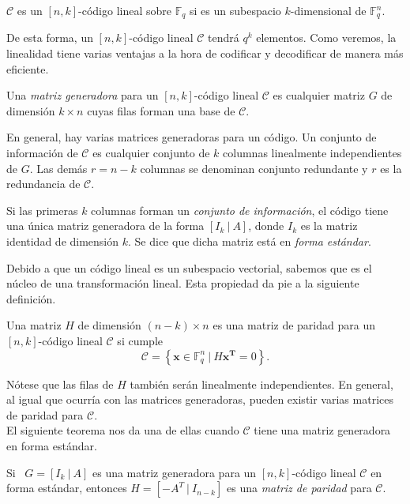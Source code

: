 \begin{definicion}
$\mathcal{C}$ es un $[n,k]$-código lineal sobre $\mathds{F}_{q}$ si es un subespacio $k$-dimensional de $\mathds{F}_{q}^{n}$. 
\end{definicion}

De esta forma, un $[n,k]$-código lineal $\mathcal{C}$ tendrá $q^k$ elementos. Como veremos, la linealidad tiene varias ventajas a la hora de codificar y decodificar de manera más eficiente.

\begin{definicion}
 Una \emph{matriz generadora} para un $[n,k]$-código lineal $\mathcal{C}$ es cualquier matriz $G$ de dimensión $k \times n$ cuyas filas forman una base de $\mathcal{C}$.
\end{definicion}

En general, hay varias matrices generadoras para un código. Un conjunto de información de $\mathcal{C}$ es cualquier conjunto de $k$ columnas linealmente independientes de  $G$. Las demás $r=n-k$ columnas se denominan conjunto redundante y $r$ es la redundancia de $\mathcal{C}$.

Si las primeras $k$ columnas forman un \emph{conjunto de información}, el código tiene una única matriz generadora de la forma $[I_k \ \vert \ A]$, donde $I_k$ es la matriz identidad de dimensión $k$. Se dice que dicha matriz está en \emph{forma estándar}.

Debido a que un código lineal es un subespacio vectorial, sabemos que es el núcleo de una transformación lineal. Esta propiedad da pie a la siguiente definición.

\begin{definicion}
 Una matriz $H$ de dimensión $(n-k) \times n$ es una matriz de paridad para un $[n,k]$-código lineal $\mathcal{C}$ si cumple
  $$\mathcal{C} = \left\{\mathbf{x} \in \mathds{F}_{q}^{n} \ \vert \ H\mathbf{x^T} = 0\right\}. $$ 
\end{definicion}

Nótese que las filas de $H$ también serán linealmente independientes. En general, al igual que ocurría con las matrices generadoras, pueden existir varias matrices de paridad para $\mathcal{C}$. \\ El siguiente teorema nos da una de ellas cuando $\mathcal{C}$ tiene una matriz generadora en forma estándar.

\begin{teorema}\label{th:uno}
Si \ $ G = \left[ I_k \ \vert \ A \right] $  es una matriz generadora para un $[n,k]$-código lineal $\mathcal{C}$ en forma estándar, entonces $H = \left[ - A^T  \ \vert \ I_{n-k} \right]$ es una \emph{matriz de paridad} para $\mathcal{C}$.
\end{teorema}

